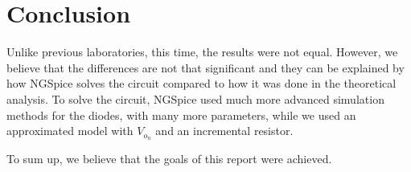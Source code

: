 \section{Conclusion}
\label{sec:conclusion}

Unlike previous laboratories, this time, the results were not equal.
However, we believe that the differences are not that significant and they can be explained by how NGSpice solves the circuit compared to how it was done in the theoretical analysis.
To solve the circuit, NGSpice used much more advanced simulation methods for the diodes, with many more parameters, while we used an approximated model with $V_o_n$ and an incremental resistor.

To sum up, we believe that the goals of this report were achieved.